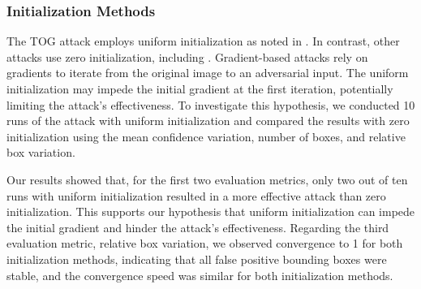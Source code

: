 

\subsubsection{Initialization Methods}

The TOG attack employs uniform initialization as noted in \citep{chow2020adversarial}. In contrast, other attacks use zero initialization, including \citep{fischer2017adversarial,li2021universal,madry2017towards}. Gradient-based attacks rely on gradients to iterate from the original image to an adversarial input. The uniform initialization may impede the initial gradient at the first iteration, potentially limiting the attack's effectiveness. To investigate this hypothesis, we conducted 10 runs of the attack with uniform initialization and compared the results with zero initialization using the mean confidence variation, number of boxes, and relative box variation.

Our results showed that, for the first two evaluation metrics, only two out of ten runs with uniform initialization resulted in a more effective attack than zero initialization. This supports our hypothesis that uniform initialization can impede the initial gradient and hinder the attack's effectiveness. Regarding the third evaluation metric, relative box variation, we observed convergence to 1 for both initialization methods, indicating that all false positive bounding boxes were stable, and the convergence speed was similar for both initialization methods.



